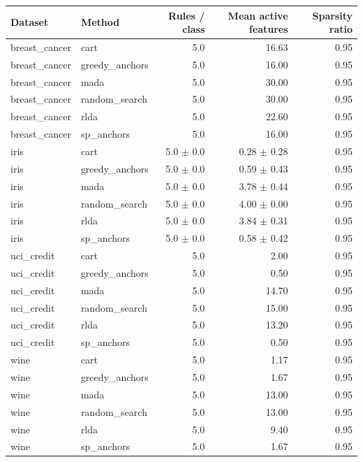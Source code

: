\begin{tabular}{llrrr}
\toprule
Dataset & Method & Rules / class & Mean active features & Sparsity ratio \\
\midrule
breast_cancer & cart & 5.0 & 16.63 & 0.95 \\
breast_cancer & greedy_anchors & 5.0 & 16.00 & 0.95 \\
breast_cancer & mada & 5.0 & 30.00 & 0.95 \\
breast_cancer & random_search & 5.0 & 30.00 & 0.95 \\
breast_cancer & rlda & 5.0 & 22.60 & 0.95 \\
breast_cancer & sp_anchors & 5.0 & 16.00 & 0.95 \\
iris & cart & 5.0 $\pm$ 0.0 & 0.28 $\pm$ 0.28 & 0.95 \\
iris & greedy_anchors & 5.0 $\pm$ 0.0 & 0.59 $\pm$ 0.43 & 0.95 \\
iris & mada & 5.0 $\pm$ 0.0 & 3.78 $\pm$ 0.44 & 0.95 \\
iris & random_search & 5.0 $\pm$ 0.0 & 4.00 $\pm$ 0.00 & 0.95 \\
iris & rlda & 5.0 $\pm$ 0.0 & 3.84 $\pm$ 0.31 & 0.95 \\
iris & sp_anchors & 5.0 $\pm$ 0.0 & 0.58 $\pm$ 0.42 & 0.95 \\
uci_credit & cart & 5.0 & 2.00 & 0.95 \\
uci_credit & greedy_anchors & 5.0 & 0.50 & 0.95 \\
uci_credit & mada & 5.0 & 14.70 & 0.95 \\
uci_credit & random_search & 5.0 & 15.00 & 0.95 \\
uci_credit & rlda & 5.0 & 13.20 & 0.95 \\
uci_credit & sp_anchors & 5.0 & 0.50 & 0.95 \\
wine & cart & 5.0 & 1.17 & 0.95 \\
wine & greedy_anchors & 5.0 & 1.67 & 0.95 \\
wine & mada & 5.0 & 13.00 & 0.95 \\
wine & random_search & 5.0 & 13.00 & 0.95 \\
wine & rlda & 5.0 & 9.40 & 0.95 \\
wine & sp_anchors & 5.0 & 1.67 & 0.95 \\
\bottomrule
\end{tabular}

